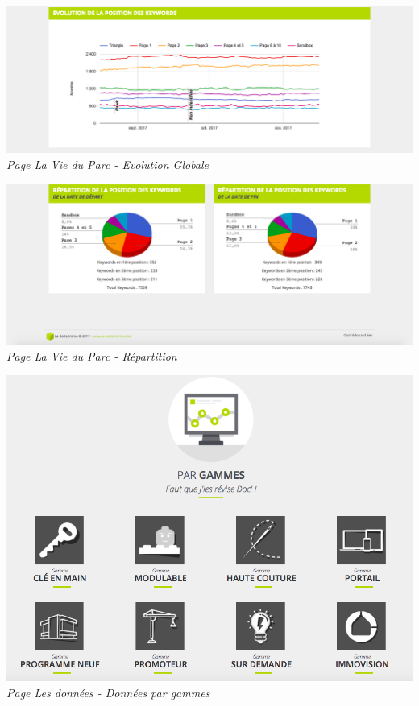 \documentclass[12pt]{article}
\begin{document}
\begin{appendix}
\begin{center}
    \includegraphics[width = 15cm]{vieParc2.png}
    \textit{Page La Vie du Parc - Evolution Globale}
    
    \includegraphics[width = 15cm]{vieParc3.png}
    \textit{Page La Vie du Parc - Répartition}
    
    \includegraphics[width = 15cm]{dataModel.png}
    \textit{Page Les données - Données par gammes}
    

\end{center}
\end{appendix}
\end{document}
